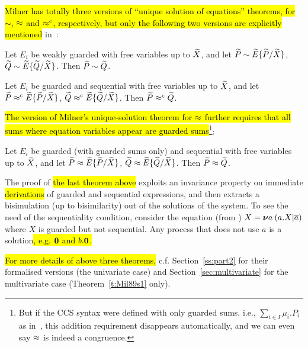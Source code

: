 \hl{Milner has totally three versions of ``unique solution of equations''
theorems, for $\sim$, $\approx$ and $\mathrel{\approx^{\rm{c}}}$, respectively, but only the
following two versions are explicitly mentioned} in~\citep[p.~103, 158]{Mil89}:
\begin{theorem}
\label{t:Mil89s1}
Let $E_i$ be weakly guarded with free variables up to $\widetilde X$,
and let ${\widetilde P} \sim {\widetilde E}\{\widetilde P /\widetilde X\}$,
  ${\widetilde Q} \sim {\widetilde E}\{\widetilde Q /\widetilde X\}$. Then ${\widetilde P} \sim {\widetilde Q}$.
\end{theorem}

\begin{theorem}
\label{t:Mil89s3}
Let $E_i$ be guarded and sequential with free
variables up to $\widetilde X$, and let ${\widetilde P} \mathrel{\approx^{\rm{c}}} {\widetilde E}\{\widetilde P /\widetilde X\}$,
  ${\widetilde Q} \mathrel{\approx^{\rm{c}}} {\widetilde E}\{\widetilde Q /\widetilde X\}$. Then ${\widetilde P} \mathrel{\approx^{\rm{c}}} {\widetilde Q}$.
\end{theorem}

\hl{The version of Milner's unique-solution theorem for $\approx$ further requires
that all sums where equation variables appear are guarded
sums}\footnote{But if the CCS syntax were defined with only guarded
  sums, i.e., $\sum_{i\in I} \mu_i.P_i$ as
  in~\cite{sangiorgi2015equations}, this addition
  requirement disappears automatically, and we can even say $\approx$ is indeed a
  congruence.}:
\begin{theorem}
\label{t:Mil89}
Let $E_i$ be guarded (with guarded sums only) and sequential with free
variables up to $\widetilde X$, and let ${\widetilde P} \approx {\widetilde E}\{\widetilde P /\widetilde X\}$,
  ${\widetilde Q} \approx {\widetilde E}\{\widetilde Q /\widetilde X\}$. Then ${\widetilde P} \approx {\widetilde Q}$.
\end{theorem}

The proof of \hl{the last theorem above} exploits an invariance
property on immediate \hl{derivations}
of guarded and sequential expressions, and then extracts a bisimulation
(up to bisimilarity) out
of the solutions of the system.
To see the need of the sequentiality  condition, consider
 the equation (from \cite{Mil89}) $X = {\boldsymbol \nu} a\: (a. X | \overline{a})$
where $X$ is guarded but not sequential. Any process that does not use
$a$ is a solution\hl{, e.g. ${\boldsymbol 0}$ and $b.{\boldsymbol 0}$.}

\hl{For more details of above three theorems,} c.f. Section~\ref{ss:part2}
for their formalised versions (the univariate case) and
Section~\ref{sec:multivariate} for the multivariate case
(Theorem~\ref{t:Mil89s1} only).

